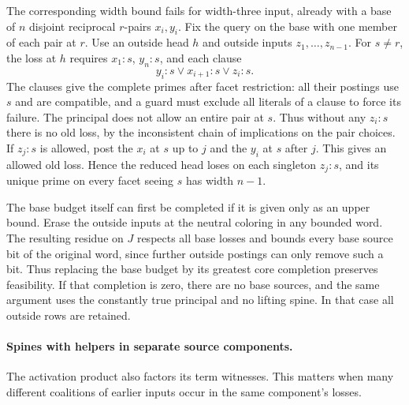 The corresponding width bound fails for width-three input,
already with a base of $n$ disjoint reciprocal $r$-pairs
$x_i,y_i$. Fix the query on the base with one member of each
pair at $r$. Use an outside head $h$ and outside inputs
$z_1,\ldots,z_{n-1}$. For $s\ne r$, the loss at $h$ requires
$x_1:s$, $y_n:s$, and each clause
\[
                 y_i:s\lor x_{i+1}:s\lor z_i:s.
\]
The clauses give the complete primes after facet restriction:
all their postings use $s$ and are compatible, and a guard
must exclude all literals of a clause to force its failure.
The principal does not allow an entire pair at $s$. Thus
without any $z_i:s$ there is no old loss, by the inconsistent
chain of implications on the pair choices. If $z_j:s$ is
allowed, post the $x_i$ at $s$ up to $j$ and the $y_i$ at $s$
after $j$. This gives an allowed old loss. Hence the reduced
head loses on each singleton $z_j:s$, and its unique prime
on every facet seeing $s$ has width $n-1$.

The base budget itself can first be completed if it is given
only as an upper bound. Erase the outside inputs at the neutral
coloring in any bounded word. The resulting residue on $J$
respects all base losses and bounds every base source bit of
the original word, since further outside postings can only
remove such a bit. Thus replacing the base budget by its
greatest core completion preserves feasibility. If that
completion is zero, there are no base sources, and the same
argument uses the constantly true principal and no lifting
spine. In that case all outside rows are retained.

\paragraph{Spines with helpers in separate source components.}
The activation product also factors its term witnesses. This matters
when many different coalitions of earlier inputs occur in the same
component's losses.

